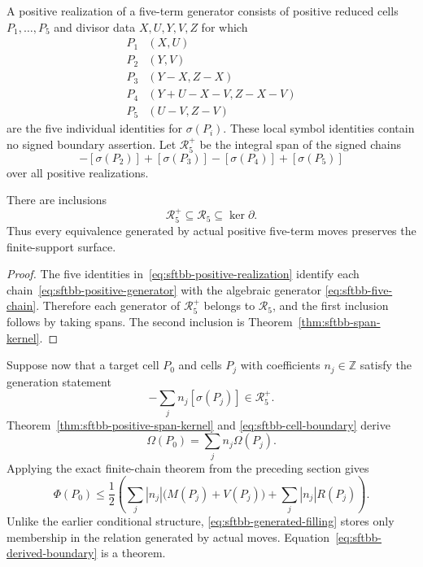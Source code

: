 A positive realization of a five-term generator consists of positive
reduced cells $P_1,\ldots,P_5$ and divisor data $X,U,Y,V,Z$ for which
\begin{equation}
\begin{array}{c|c}
P_1 &(X,U)\\
P_2 &(Y,V)\\
P_3 &(Y-X,Z-X)\\
P_4 &(Y+U-X-V,Z-X-V)\\
P_5 &(U-V,Z-V)
\end{array}
\label{eq:sftbb-positive-realization}
\end{equation}
are the five individual identities for $\sigma(P_i)$.  These local symbol
identities contain no signed boundary assertion.  Let $\mathcal R_5^+$ be
the integral span of the signed chains
\begin{equation}
 [\sigma(P_1)]-[\sigma(P_2)]+[\sigma(P_3)]
 -[\sigma(P_4)]+[\sigma(P_5)]
 \label{eq:sftbb-positive-generator}
\end{equation}
over all positive realizations.

\begin{theorem}
\label{thm:sftbb-positive-span-kernel}
There are inclusions
\[
 \mathcal R_5^+\subseteq\mathcal R_5\subseteq\ker\partial.
\]
Thus every equivalence generated by actual positive five-term moves
preserves the finite-support surface.
\end{theorem}

\begin{proof}
The five identities in~\eqref{eq:sftbb-positive-realization} identify each
chain~\eqref{eq:sftbb-positive-generator} with the algebraic generator
\eqref{eq:sftbb-five-chain}.  Therefore each generator of
$\mathcal R_5^+$ belongs to $\mathcal R_5$, and the first inclusion follows
by taking spans.  The second inclusion is
Theorem~\ref{thm:sftbb-span-kernel}.
\end{proof}

Suppose now that a target cell $P_0$ and cells $P_j$ with coefficients
$n_j\in\mathbb Z$ satisfy the generation statement
\begin{equation}
 [\sigma(P_0)]-\sum_jn_j[\sigma(P_j)]\in\mathcal R_5^+.
 \label{eq:sftbb-generated-filling}
\end{equation}
Theorem~\ref{thm:sftbb-positive-span-kernel} and
\eqref{eq:sftbb-cell-boundary} derive
\begin{equation}
 \Omega(P_0)=\sum_jn_j\Omega(P_j).
 \label{eq:sftbb-derived-boundary}
\end{equation}
Applying the exact finite-chain theorem from the preceding section gives
\begin{equation}
 \Phi(P_0)\leq\frac12\left(
   \sum_j|n_j|\bigl(M(P_j)+V(P_j)\bigr)
   +\sum_j|n_j|R(P_j)\right).
 \label{eq:sftbb-generated-cost}
\end{equation}
Unlike the earlier conditional structure,
\eqref{eq:sftbb-generated-filling} stores only membership in the relation
generated by actual moves.  Equation~\eqref{eq:sftbb-derived-boundary} is a
theorem.

